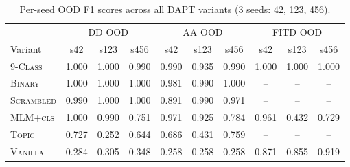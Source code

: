 \begin{table}[h]
\centering
\caption{Per-seed OOD F1 scores across all DAPT variants (3 seeds: 42, 123, 456).}
\label{tab:per-seed-f1}
\begin{tabular}{l|ccc|ccc|ccc}
\toprule
& \multicolumn{3}{c|}{DD OOD} & \multicolumn{3}{c|}{AA OOD} & \multicolumn{3}{c}{FITD OOD} \\
Variant & s42 & s123 & s456 & s42 & s123 & s456 & s42 & s123 & s456 \\
\midrule
\textsc{9-Class} & 1.000 & 1.000 & 0.990 & 0.990 & 0.935 & 0.990 & 1.000 & 1.000 & 1.000 \\
\textsc{Binary} & 1.000 & 1.000 & 1.000 & 0.981 & 0.990 & 1.000 & -- & -- & -- \\
\textsc{Scrambled} & 0.990 & 1.000 & 1.000 & 0.891 & 0.990 & 0.971 & -- & -- & -- \\
\textsc{MLM+cls} & 1.000 & 0.990 & 0.751 & 0.971 & 0.925 & 0.784 & 0.961 & 0.432 & 0.729 \\
\textsc{Topic} & 0.727 & 0.252 & 0.644 & 0.686 & 0.431 & 0.759 & -- & -- & -- \\
\textsc{Vanilla} & 0.284 & 0.305 & 0.348 & 0.258 & 0.258 & 0.258 & 0.871 & 0.855 & 0.919 \\
\bottomrule
\end{tabular}
\end{table}